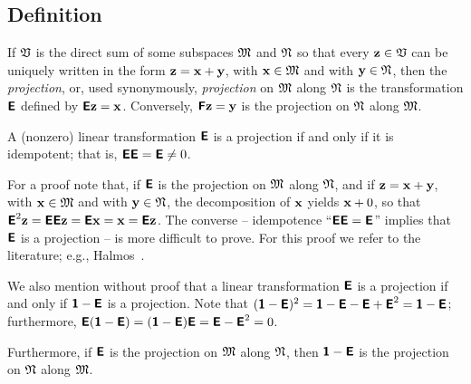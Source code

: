 \subsection{Definition}
If ${\frak V}$ is the direct sum of some subspaces
${\frak M}$
and
${\frak N}$
so that every ${\bf z} \in {\frak V}$ can be uniquely written in the form
$
{\bf z}
=
{\bf x}
+
{\bf y}
$, with
${\bf x} \in {\frak M}$
and with
${\bf y} \in {\frak N}$,
then
the {\em projection}, or, used synonymously,
{\em projection}
on ${\frak M}$
along ${\frak N}$ is the transformation $\textsf{\textbf{E}}$
defined by $\textsf{\textbf{E}}{\bf z}={\bf x}$.
Conversely,
 $\textsf{\textbf{F}}{\bf z}={\bf y}$  is the projection
on ${\frak N}$
along ${\frak M}$.

A (nonzero) linear transformation
$\textsf{\textbf{E}}$ is a projection if and only if
it is idempotent; that is,
$\textsf{\textbf{E}}\textsf{\textbf{E}}=\textsf{\textbf{E}}\neq 0$.

{\color{OliveGreen}
\bproof
For a proof note that, if $\textsf{\textbf{E}}$  is the projection
on ${\frak M}$
along ${\frak N}$,
and if
$
{\bf z}
=
{\bf x}
+
{\bf y}
$, with
${\bf x} \in {\frak M}$
and with
${\bf y} \in {\frak N}$,
the decomposition of ${\bf x}$ yields
${\bf x}+0$, so that
$\textsf{\textbf{E}}^2{\bf z}=\textsf{\textbf{E}}\textsf{\textbf{E}}{\bf z}=\textsf{\textbf{E}}{\bf x}
={\bf x}=\textsf{\textbf{E}}{\bf z}$.
The converse --
idempotence
``$\textsf{\textbf{E}}\textsf{\textbf{E}}=\textsf{\textbf{E}}$''
implies that $\textsf{\textbf{E}}$ is a projection -- is more difficult to prove.
For this proof we refer to the literature; e.g., Halmos~\cite{halmos-vs}.
\eproof
}

We also mention without proof that a linear transformation
$\textsf{\textbf{E}}$ is a projection if and only if
$\textsf{\textbf{1}}-\textsf{\textbf{E}}$ is a projection.
Note that $(\textsf{\textbf{1}}-\textsf{\textbf{E}})^2
=\textsf{\textbf{1}}-\textsf{\textbf{E}}-\textsf{\textbf{E}}+ \textsf{\textbf{E}}^2
=\textsf{\textbf{1}}-\textsf{\textbf{E}}$;
furthermore,
$
\textsf{\textbf{E}}(\textsf{\textbf{1}}-\textsf{\textbf{E}})=
(\textsf{\textbf{1}}-\textsf{\textbf{E}})\textsf{\textbf{E}}=
\textsf{\textbf{E}}- \textsf{\textbf{E}}^2=0
$.


Furthermore, if $\textsf{\textbf{E}}$  is the projection
on ${\frak M}$
along ${\frak N}$,
then
 $\textsf{\textbf{1}}-\textsf{\textbf{E}}$ is the projection
on ${\frak N}$
along ${\frak M}$.




